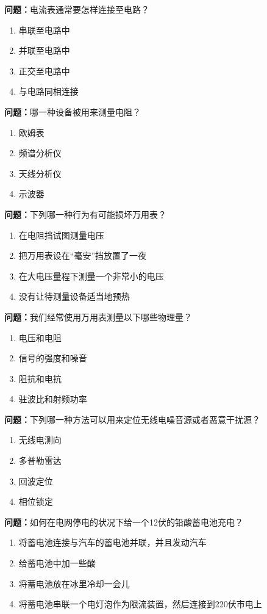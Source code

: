 \documentclass{ctexbook}
\begin{document}
\textbf{问题：}电流表通常要怎样连接至电路？
\begin{enumerate}[label=\Alph*), leftmargin=3em]
\item 串联至电路中
\item 并联至电路中
\item 正交至电路中
\item 与电路同相连接
\end{enumerate}

\textbf{问题：}哪一种设备被用来测量电阻？
\begin{enumerate}[label=\Alph*), leftmargin=3em]
\item 欧姆表
\item 频谱分析仪
\item 天线分析仪
\item 示波器
\end{enumerate}

\textbf{问题：}下列哪一种行为有可能损坏万用表？
\begin{enumerate}[label=\Alph*), leftmargin=3em]
\item 在电阻挡试图测量电压
\item 把万用表设在“毫安”挡放置了一夜
\item 在大电压量程下测量一个非常小的电压
\item 没有让待测量设备适当地预热
\end{enumerate}

\textbf{问题：}我们经常使用万用表测量以下哪些物理量？
\begin{enumerate}[label=\Alph*), leftmargin=3em]
\item 电压和电阻
\item 信号的强度和噪音
\item 阻抗和电抗
\item 驻波比和射频功率
\end{enumerate}

\textbf{问题：}下列哪一种方法可以用来定位无线电噪音源或者恶意干扰源？
\begin{enumerate}[label=\Alph*), leftmargin=3em]
\item 无线电测向
\item 多普勒雷达
\item 回波定位
\item 相位锁定
\end{enumerate}

\textbf{问题：}如何在电网停电的状况下给一个12伏的铅酸蓄电池充电？
\begin{enumerate}[label=\Alph*), leftmargin=3em]
\item 将蓄电池连接与汽车的蓄电池并联，并且发动汽车
\item 给蓄电池中加一些酸
\item 将蓄电池放在冰里冷却一会儿
\item 将蓄电池串联一个电灯泡作为限流装置，然后连接到220伏市电上
\end{enumerate}
\end{document}
